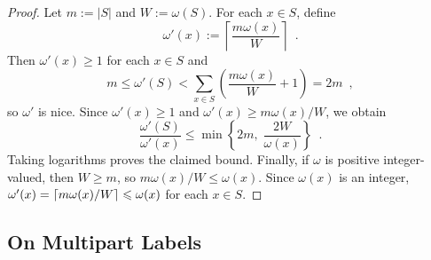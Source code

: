 \documentclass{patmorin}
\renewcommand{\ge}{\geqslant}
\renewcommand{\le}{\leqslant}
\DeclarePairedDelimiter{\ceil}{\lceil}{\rceil}
\begin{document}
\begin{proof}
  Let $m:=|S|$ and $W:=\omega(S)$. For each $x\in S$, define
  \[
    \omega'(x):=\left\lceil\frac{m\omega(x)}{W}\right\rceil\enspace.
  \]
  Then $\omega'(x)\ge 1$ for each $x\in S$ and
  \[
    m\le\omega'(S)<\sum_{x\in S}\left(\frac{m\omega(x)}{W}+1\right)=2m\enspace,
  \]
  so $\omega'$ is nice. Since $\omega'(x)\ge 1$ and $\omega'(x)\ge m\omega(x)/W$, we obtain
  \[
    \frac{\omega'(S)}{\omega'(x)}\le\min\left\{2m,\;\frac{2W}{\omega(x)}\right\}\enspace.
  \]
  Taking logarithms proves the claimed bound. Finally, if $\omega$ is positive integer-valued, then $W\ge m$, so $m\omega(x)/W\le\omega(x)$. Since $\omega(x)$ is an integer, $\omega'(x)=\ceil{m\omega(x)/W}\le\omega(x)$ for each $x\in S$.
\end{proof}



\subsection{On Multipart Labels}
\label{multipart}
\end{document}

